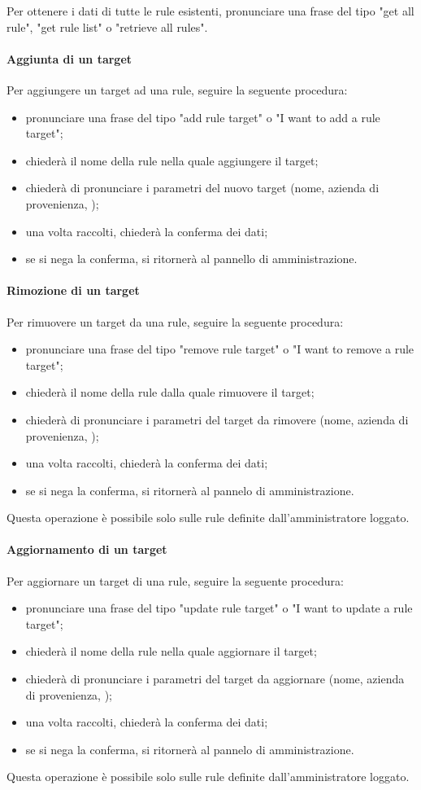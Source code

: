 Per ottenere i dati di tutte le rule esistenti, pronunciare una frase del tipo "get all rule", "get rule list" o "retrieve all rules".
\paragraph{Aggiunta di un target}\label{addRuleTarget}
Per aggiungere un target ad una rule, seguire la seguente procedura:
\begin{itemize}
	\item pronunciare una frase del tipo "add rule target" o "I want to add a rule target";
	\item \PROGETTO{} chiederà il nome della rule nella quale aggiungere il target;
	\item \PROGETTO{} chiederà di pronunciare i parametri del nuovo target (nome, azienda di provenienza, );
	\item una volta raccolti, \PROGETTO{} chiederà la conferma dei dati;
	\item se si nega la conferma, si ritornerà al pannello di amministrazione.
\end{itemize}
\paragraph{Rimozione di un target}
Per rimuovere un target da una rule, seguire la seguente procedura:
\begin{itemize}
	\item pronunciare una frase del tipo "remove rule target" o "I want to remove a rule target";
	\item \PROGETTO{} chiederà il nome della rule dalla quale rimuovere il target;
	\item \PROGETTO{} chiederà di pronunciare i parametri del target da rimovere (nome, azienda di provenienza, );
	\item una volta raccolti, \PROGETTO{} chiederà la conferma dei dati;
	\item se si nega la conferma, si ritornerà al pannelo di amministrazione.
\end{itemize}
Questa operazione è possibile solo sulle rule definite dall'amministratore loggato.
\paragraph{Aggiornamento di un target}\label{updateRuleTarget}
Per aggiornare un target di una rule, seguire la seguente procedura:
\begin{itemize}
	\item pronunciare una frase del tipo "update rule target" o "I want to update a rule target";
	\item \PROGETTO{} chiederà il nome della rule nella quale aggiornare il target;
	\item \PROGETTO{} chiederà di pronunciare i parametri del target da aggiornare (nome, azienda di provenienza, );
	\item una volta raccolti, \PROGETTO{} chiederà la conferma dei dati;
	\item se si nega la conferma, si ritornerà al pannelo di amministrazione.
\end{itemize}
Questa operazione è possibile solo sulle rule definite dall'amministratore loggato.
